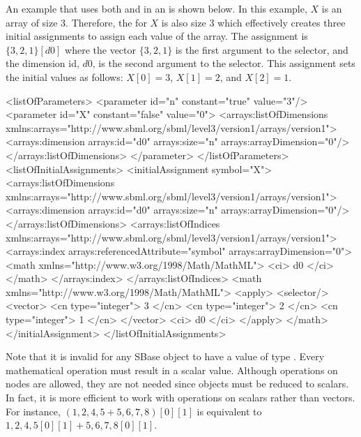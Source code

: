 An example that uses both  and  in an \InitialAssignment is shown below.   In this example, $X$ is an array of size 3.  Therefore, the \InitialAssignment for $X$ is also size 3 which effectively creates three initial assignments to assign each value of the array.  The assignment is $\{ 3, 2, 1 \}[d0]$ where the vector $\{ 3, 2, 1 \}$ is the first argument to the selector, and the \InitialAssignment dimension id, $d0$, is the second argument to the selector.  This assignment sets the initial values as follows: $X[0]=3$, $X[1]=2$, and $X[2]=1$.
\begin{example}[showstringspaces=false]
<listOfParameters>
  <parameter id="n" constant="true" value="3"/>
  <parameter id="X" constant="false" value="0">
    <arrays:listOfDimensions xmlns:arrays="http://www.sbml.org/sbml/level3/version1/arrays/version1">
      <arrays:dimension arrays:id="d0" arrays:size="n" arrays:arrayDimension="0"/>
    </arrays:listOfDimensions>
  </parameter>
</listOfParameters>
<listOfInitialAssignments>
  <initialAssignment symbol="X">
    <arrays:listOfDimensions xmlns:arrays="http://www.sbml.org/sbml/level3/version1/arrays/version1">
      <arrays:dimension arrays:id="d0" arrays:size="n" arrays:arrayDimension="0"/>
    </arrays:listOfDimensions>
    <arrays:listOfIndices xmlns:arrays="http://www.sbml.org/sbml/level3/version1/arrays/version1">
      <arrays:index arrays:referencedAttribute="symbol" arrays:arrayDimension="0">
        <math xmlns="http://www.w3.org/1998/Math/MathML">            
          <ci> d0 </ci>
        </math>
      </arrays:index>
    </arrays:listOfIndices>
    <math xmlns="http://www.w3.org/1998/Math/MathML">        
      <apply>
        <selector/>
        <vector>
          <cn type="integer"> 3 </cn>
          <cn type="integer"> 2 </cn>
          <cn type="integer"> 1 </cn>
        </vector>
        <ci> d0 </ci>
      </apply>
    </math>
  </initialAssignment>
</listOfInitialAssignments>
\end{example}
Note that it is invalid for any SBase object to have a value of type .  Every mathematical operation must result in a scalar value.  Although operations on  nodes are allowed, they are not needed since  objects must be reduced to scalars.  In fact, it is more efficient to work with operations on scalars rather than vectors. For instance, $({{1,2},{4,5}}+{{5,6},{7,8}})[0][1]$ is equivalent to ${{1,2},{4,5}}[0][1] + {{5,6},{7,8}}[0][1]$.
